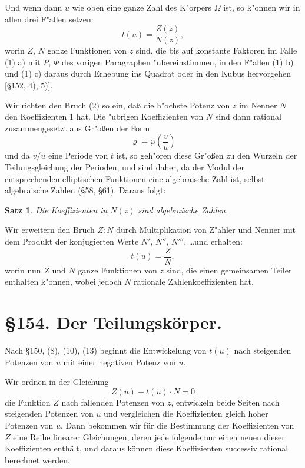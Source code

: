 \documentclass[12pt,a4paper]{article}
\newtheorem*{satz}{Satz}
\begin{document}
Und wenn dann $u$ wie oben eine ganze Zahl des K"orpers $\Omega$ ist, so k"onnen wir in allen drei F"allen setzen:
\begin{equation}t(u) = \frac{Z(z)}{N(z)},\end{equation}
worin $Z$, $N$ ganze Funktionen von $z$ sind, die bis auf konstante Faktoren im Falle (1) a) mit $P$, $\Phi$ des vorigen Paragraphen "ubereinstimmen, in den F"allen (1) b) und (1) c) daraus durch Erhebung ins Quadrat oder in den Kubus hervorgehen [\S 152, 4), 5)].

Wir richten den Bruch (2) so ein, da\ss{} die h"ochste Potenz von $z$ im Nenner $N$ den Koeffizienten 1 hat. Die "ubrigen Koeffizienten von $N$ sind dann rational zusammengesetzt aus Gr"o\ss{}en der Form
\[\varrho = \wp\left(\frac{v}{u}\right)\]
und da $v/u$ eine Periode von $t$ ist, so geh"oren diese Gr"o\ss{}en zu den Wurzeln der Teilungsgleichung der Perioden, und sind daher, da der Modul der entsprechenden elliptischen Funktionen eine algebraische Zahl ist, selbst algebraische Zahlen (\S 58, \S 61). Daraus folgt:

\begin{satz}
Die Koeffizienten in $N(z)$ sind algebraische Zahlen.
\end{satz}

Wir erweitern den Bruch $Z:N$ durch Multiplikation von Z"ahler und Nenner mit dem Produkt der konjugierten Werte $N'$, $N''$, $N'''$, \ldots und erhalten:
\begin{equation}t(u) = \frac{Z}{N},\end{equation}
worin nun $Z$ und $N$ ganze Funktionen von $z$ sind, die einen gemeinsamen Teiler enthalten k"onnen, wobei jedoch $N$ rationale Zahlenkoeffizienten hat.

\section*{\S 154. Der Teilungsk\"orper.}

Nach \S 150, (8), (10), (13) beginnt die Entwickelung von $t(u)$ nach steigenden Potenzen von $u$ mit einer negativen Potenz von $u$.

Wir ordnen in der Gleichung
\begin{equation}Z(u) - t(u) \cdot N = 0\end{equation}
die Funktion $Z$ nach fallenden Potenzen von $z$, entwickeln beide Seiten nach steigenden Potenzen von $u$ und vergleichen die Koeffizienten gleich hoher Potenzen von $u$. Dann bekommen wir f\"ur die Bestimmung der Koeffizienten von $Z$ eine Reihe linearer Gleichungen, deren jede folgende nur einen neuen dieser Koeffizienten enth\"alt, und daraus k\"onnen diese Koeffizienten successiv rational berechnet werden.
\end{document}
